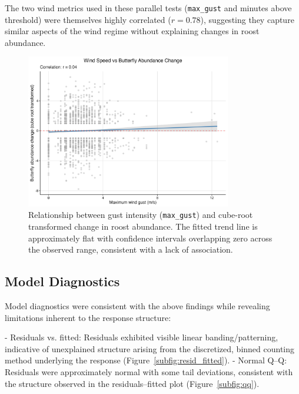 The two wind metrics used in these parallel tests (\texttt{max\_gust} and minutes above threshold) were themselves highly correlated (\(r = 0.78\)), suggesting they capture similar aspects of the wind regime without explaining changes in roost abundance.

\begin{figure}[H]
  \centering
  \includegraphics[width=0.8\textwidth]{supplemental/results/thesis_exports/figures/wind_hypothesis_scatter.png}
  \caption{Relationship between gust intensity (\texttt{max\_gust}) and cube-root transformed change in roost abundance. The fitted trend line is approximately flat with confidence intervals overlapping zero across the observed range, consistent with a lack of association.}
  \label{fig:wind_scatter}
\end{figure}


\subsection{Model Diagnostics}

Model diagnostics were consistent with the above findings while revealing limitations inherent to the response structure:

- Residuals vs. fitted: Residuals exhibited visible linear banding/patterning, indicative of unexplained structure arising from the discretized, binned counting method underlying the response (Figure~\ref{subfig:resid_fitted}).
- Normal Q–Q: Residuals were approximately normal with some tail deviations, consistent with the structure observed in the residuals–fitted plot (Figure~\ref{subfig:qq}).

